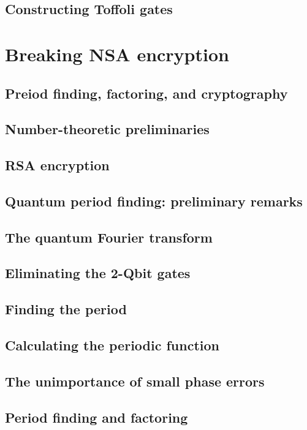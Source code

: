 \documentclass{book}
\theoremstyle{definition}
\begin{document}
\subsection{Constructing Toffoli gates}


\newpage


\section{Breaking NSA encryption}

\subsection{Preiod finding, factoring, and cryptography}
\subsection{Number-theoretic preliminaries}
\subsection{RSA encryption}
\subsection{Quantum period finding: preliminary remarks}
\subsection{The quantum Fourier transform}
\subsection{Eliminating the 2-Qbit gates}
\subsection{Finding the period}
\subsection{Calculating the periodic function}
\subsection{The unimportance of small phase errors}
\subsection{Period finding and factoring}
\end{document}
